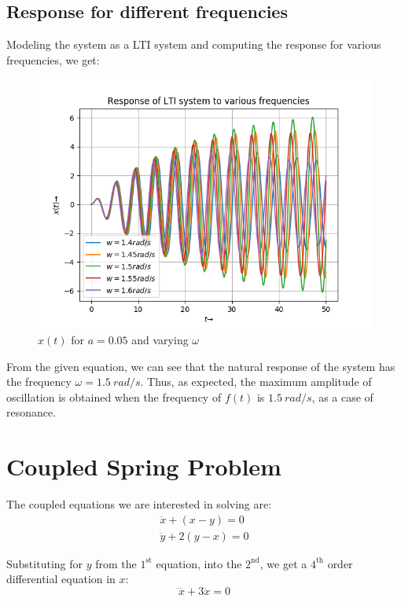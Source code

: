 \documentclass[11pt, a4paper, twoside]{article}
\begin{document}
    \subsection{Response for different frequencies}
        Modeling the system as a LTI system and computing the response for various frequencies, we get:
        \begin{figure}[H]
            \centering
            \includegraphics[scale=0.7]{Fig 3.png}
            \caption{$x(t)$ for $a=0.05$ and varying $\omega$}
            \label{fig:Fig3}
        \end{figure}
        
        From the given equation, we can see that the natural response of the system has the frequency $\omega= 1.5\ rad/s$. 
        Thus, as expected, the maximum amplitude of oscillation is obtained when the frequency of $f(t)$ is $1.5\ rad/s$, as a case of resonance.
\section{Coupled Spring Problem}
    The coupled equations we are interested in solving are:
    \begin{gather*}
        \ddot{x} + (x-y) = 0\\
        \ddot{y} + 2(y-x) = 0
    \end{gather*}
    
    Substituting for $y$ from the $1^{\text{st}}$ equation, into the $2^{\text{nd}}$, we get a $4^{\text{th}}$ order differential equation in $x$:
    \begin{equation*}
        \ddddot{x} + 3\ddot{x} = 0
    \end{equation*}
    
\end{document}
